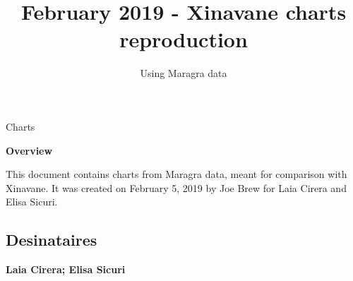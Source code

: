 \documentclass[]{article}
\title{February 2019 - Xinavane charts reproduction}
\subtitle{Using Maragra data}
\author{}
\date{}
\begin{document}
\maketitle

\begin{center}
\begin{large}

Charts

\end{large}
\end{center}

\vspace{5mm}

\begin{center}
\textbf{Overview}  
\end{center}

\vspace{5mm}

\begin{center}
\begin{changemargin}{3cm}{3cm} 

This document contains charts from Maragra data, meant for comparison with Xinavane. It was created on February 5, 2019 by Joe Brew for Laia Cirera and Elisa Sicuri.

\end{changemargin}
\end{center}

\vspace{20mm}

\noindent{}

\vfill
\null

\subsection*{Desinataires}

\textbf{Laia Cirera; Elisa Sicuri}

\vspace{3mm}
\end{document}
